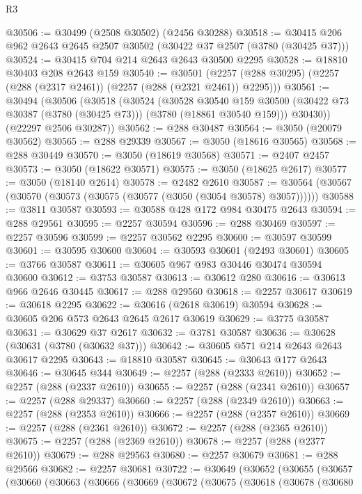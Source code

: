\begin{lexlean}{R3}
\begin{coremodule}
@30506 := @30499 (@2508 @30502) (@2456 @30288)
@30518 := @30415 @206 @962 @2643 @2645 @2507 @30502 (@30422 @37 @2507 (@3780 (@30425 @37)))
@30524 := @30415 @704 @214 @2643 @2643 @30500 @2295
@30528 := @18810 @30403 @208 @2643 @159
@30540 := @30501
    (@2257 (@288 @30295) (@2257 (@288 (@2317 @2461)) (@2257 (@288 (@2321 @2461)) @2295)))
@30561 := @30494
    (@30506
      (@30518
        (@30524
          (@30528
            @30540
            @159
            @30500
            (@30422 @73 @30387 (@3780 (@30425 @73)))
            (@3780 (@18861 @30540 @159)))
          @30430))
      (@22297 @2506 @30287))
@30562 := @288 @30487
@30564 := @3050 (@20079 @30562)
@30565 := @288 @29339
@30567 := @3050 (@18616 @30565)
@30568 := @288 @30449
@30570 := @3050 (@18619 @30568)
@30571 := @2407 @2457
@30573 := @3050 (@18622 @30571)
@30575 := @3050 (@18625 @2617)
@30577 := @3050 (@18140 @2614)
@30578 := @2482 @2610
@30587 := @30564 (@30567 (@30570 (@30573 (@30575 (@30577 (@3050 (@3054 @30578) @3057))))))
@30588 := @3811 @30587
@30593 := @30588 @428 @172 @984 @30475 @2643
@30594 := @288 @29561
@30595 := @2257 @30594
@30596 := @288 @30469
@30597 := @2257 @30596
@30599 := @2257 @30562 @2295
@30600 := @30597 @30599
@30601 := @30595 @30600
@30604 := @30593 @30601 (@2493 @30601)
@30605 := @3766 @30587
@30611 := @30605 @967 @983 @30446 @30474 @30594 @30600
@30612 := @3753 @30587
@30613 := @30612 @280
@30616 := @30613 @966 @2646 @30445
@30617 := @288 @29560
@30618 := @2257 @30617
@30619 := @30618 @2295
@30622 := @30616 (@2618 @30619) @30594
@30628 := @30605 @206 @573 @2643 @2645 @2617 @30619
@30629 := @3775 @30587
@30631 := @30629 @37 @2617
@30632 := @3781 @30587
@30636 := @30628 (@30631 (@3780 (@30632 @37)))
@30642 := @30605 @571 @214 @2643 @2643 @30617 @2295
@30643 := @18810 @30587
@30645 := @30643 @177 @2643
@30646 := @30645 @344
@30649 := @2257 (@288 (@2333 @2610))
@30652 := @2257 (@288 (@2337 @2610))
@30655 := @2257 (@288 (@2341 @2610))
@30657 := @2257 (@288 @29337)
@30660 := @2257 (@288 (@2349 @2610))
@30663 := @2257 (@288 (@2353 @2610))
@30666 := @2257 (@288 (@2357 @2610))
@30669 := @2257 (@288 (@2361 @2610))
@30672 := @2257 (@288 (@2365 @2610))
@30675 := @2257 (@288 (@2369 @2610))
@30678 := @2257 (@288 (@2377 @2610))
@30679 := @288 @29563
@30680 := @2257 @30679
@30681 := @288 @29566
@30682 := @2257 @30681
@30722 := @30649
    (@30652
      (@30655
        (@30657
          (@30660
            (@30663
              (@30666
                (@30669
                  (@30672
                    (@30675
                      (@30618
                        (@30678
                          (@30680

\end{coremodule}
\end{lexlean}
